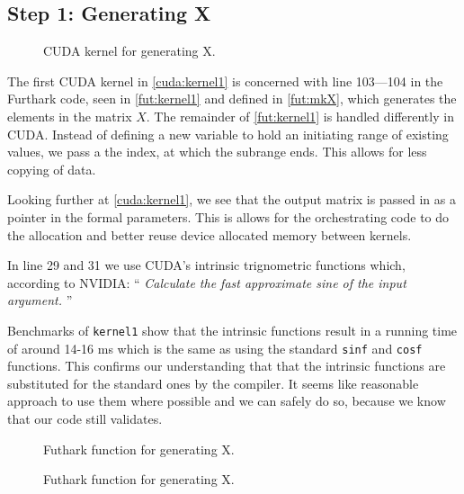 \subsection{
    Step 1: Generating X
}

\begin{figure}[H]
    \centering
    \caption{CUDA kernel for generating X.}
    \label{cuda:kernel1}
\end{figure}



The first CUDA kernel in \autoref{cuda:kernel1} is concerned with line 103---104
in the Furthark code, seen in \autoref{fut:kernel1} and defined in \autoref{fut:mkX},
which generates the elements in the matrix \(X\).
The remainder of \autoref{fut:kernel1} is handled differently in CUDA. Instead of
defining a new variable to hold an initiating range of existing values, we pass a
the index, at which the subrange ends. This allows for less copying of data.

Looking further at \autoref{cuda:kernel1}, we see that the output matrix is
passed in as a pointer in the formal parameters. This is allows for the
orchestrating code to do the allocation and better reuse device allocated memory
between kernels.

In line 29 and 31 we use CUDA's intrinsic trignometric functions which,
according to NVIDIA:
\enquote{
    \textit{
Calculate the fast approximate sine of the input argument.
}
}

Benchmarks of \texttt{kernel1} show that the intrinsic functions result in a
running time of around 14-16 ms which is the same as using the standard
\texttt{sinf} and \texttt{cosf} functions. This confirms our understanding that
that the intrinsic functions are substituted for the standard ones by the
compiler.  It seems like reasonable approach to use them where possible and we
can safely do so, because we know that our code still validates.

\begin{figure}[H]
    \centering
    \caption{Futhark function for generating X.}
    \label{fut:kernel1}
\end{figure}


\begin{figure}[H]
    \centering
    \caption{Futhark function for generating X.}
    \label{fut:mkX}
\end{figure}




